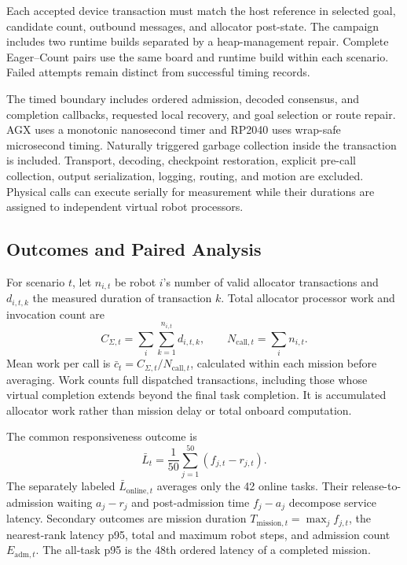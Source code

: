 \documentclass[conference]{IEEEtran}
\begin{document}
Each accepted device transaction must match the host reference in selected goal, candidate count, outbound messages, and allocator post-state. The campaign includes two runtime builds separated by a heap-management repair. Complete Eager--Count pairs use the same board and runtime build within each scenario. Failed attempts remain distinct from successful timing records.

The timed boundary includes ordered admission, decoded consensus, and completion callbacks, requested local recovery, and goal selection or route repair. AGX uses a monotonic nanosecond timer and RP2040 uses wrap-safe microsecond timing. Naturally triggered garbage collection inside the transaction is included. Transport, decoding, checkpoint restoration, explicit pre-call collection, output serialization, logging, routing, and motion are excluded. Physical calls can execute serially for measurement while their durations are assigned to independent virtual robot processors.

\subsection{Outcomes and Paired Analysis}
\label{sec:analysis}
For scenario $t$, let $n_{i,t}$ be robot $i$'s number of valid allocator transactions and $d_{i,t,k}$ the measured duration of transaction $k$. Total allocator processor work and invocation count are
\begin{equation}
 C_{\Sigma,t}=\sum_i\sum_{k=1}^{n_{i,t}}d_{i,t,k},
 \qquad N_{\mathrm{call},t}=\sum_i n_{i,t}.
 \label{eq:work}
\end{equation}
Mean work per call is $\bar c_t=C_{\Sigma,t}/N_{\mathrm{call},t}$, calculated within each mission before averaging. Work counts full dispatched transactions, including those whose virtual completion extends beyond the final task completion. It is accumulated allocator work rather than mission delay or total onboard computation.

The common responsiveness outcome is
\begin{equation}
 \bar L_t=\frac{1}{50}\sum_{j=1}^{50}(f_{j,t}-r_{j,t}).
 \label{eq:latency}
\end{equation}
The separately labeled $\bar L_{\mathrm{online},t}$ averages only the 42 online tasks. Their release-to-admission waiting $a_j-r_j$ and post-admission time $f_j-a_j$ decompose service latency. Secondary outcomes are mission duration $T_{\mathrm{mission},t}=\max_j f_{j,t}$, the nearest-rank latency p95, total and maximum robot steps, and admission count $E_{\mathrm{adm},t}$. The all-task p95 is the 48th ordered latency of a completed mission.
\end{document}
